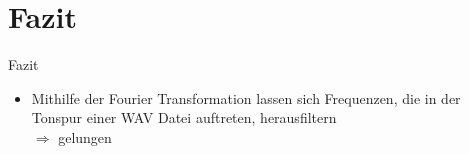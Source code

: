 \section{Fazit}
\begin{frame}{Fazit}
	\begin{itemize}
		\item Mithilfe der Fourier Transformation lassen sich Frequenzen, die in der Tonspur einer WAV Datei auftreten, herausfiltern
		\\ $\Rightarrow$ gelungen
	\end{itemize}

\end{frame}

